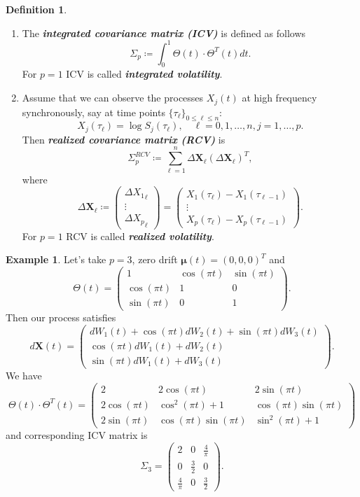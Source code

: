 \documentclass[a4paper,11pt]{book}
\theoremstyle{plain}
\theoremstyle{definition}
\newtheorem{defn}[thm]{Definition}
\newtheorem{exmp}[thm]{Example}
\newcommand{\define}[1]{\textit{\textbf{#1}}}
\begin{document}
	\begin{defn} \
		\begin{enumerate}
			\item The \define{integrated covariance matrix (ICV)} is defined as follows
			\[\Sigma_p \coloneqq \int_0^1\Theta(t) \cdot \Theta^T(t) dt.\]
			For $p=1$ ICV is called \define{integrated volatility}.
			\item Assume that we can observe the processes $X_j(t)$ at high frequency synchronously, say at time points $ \{\tau_\ell\}_{0 \leq \ell \leq n}$:
			\[ X_j(\tau_\ell) = \log S_j(\tau_\ell), \quad \ell = 0, 1, \dots, n, j = 1, \dots, p. \]
			 Then \define{realized covariance matrix (RCV)} is
			\begin{equation} \label{RCV}
				\Sigma_p^{RCV} \coloneqq \sum_{\ell=1}^{n}\Delta \mathbf{X}_\ell(\Delta \mathbf{X}_\ell)^T,
			\end{equation}
			where 
			\[ \Delta \mathbf{X}_\ell \coloneqq
			\begin{pmatrix}
			\Delta {X_1}_\ell \\
			\vdots \\
			\Delta {X_p}_\ell
			\end{pmatrix}
			=
			\begin{pmatrix}
			X_1(\tau_{\ell}) - X_1(\tau_{\ell-1}) \\
			\vdots \\
			X_p(\tau_{\ell}) - X_p(\tau_{\ell-1})
			\end{pmatrix}. \]
			For $p=1$ RCV is called \define{realized volatility}.
		\end{enumerate}
	\end{defn}
	
	\begin{exmp} \label{exmp X3}
	    Let's take $p = 3$, zero drift $\boldsymbol{\mu}(t) = (0, 0, 0)^T$ and 
		\[ \Theta(t) = \begin{pmatrix}
		1 & \cos(\pi t) & \sin (\pi t) \\
		\cos(\pi t) & 1 & 0 \\
		\sin (\pi t) & 0 & 1
		\end{pmatrix}. \]
		Then our process satisfies
		\[ d\mathbf{X}(t) = \begin{pmatrix}
		dW_1(t)+\cos(\pi t) dW_2(t) +\sin(\pi t)dW_3(t)  \\
	    \cos(\pi t) dW_1(t) + dW_2(t) \\
		\sin(\pi t) dW_1(t)+ dW_3(t)
		\end{pmatrix}. \]
		We have
		\[ \Theta(t) \cdot \Theta^T(t) = \begin{pmatrix}
		2 & 2\cos(\pi t) & 2\sin (\pi t) \\
		2\cos(\pi t) & \cos^2(\pi t) + 1 & \cos(\pi t)\sin(\pi t) \\
		2\sin (\pi t) & \cos(\pi t)\sin(\pi t) & \sin^2(\pi t)+1
		\end{pmatrix} \]
		and corresponding ICV matrix is
		\[ \Sigma_3 = \begin{pmatrix}
		2 & 0 & \frac{4}{\pi} \\
		0 & \frac{3}{2} & 0 \\
		\frac{4}{\pi} & 0 & \frac{3}{2}
		\end{pmatrix}. \]
	\end{exmp}
	
\end{document}

